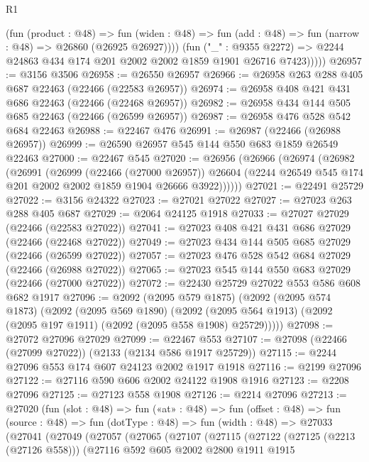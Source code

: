 \begin{lexlean}{R1}
\begin{coremodule}
                (fun (product : @48) =>
                fun (widen : @48) =>
                fun (add : @48) => fun (narrow : @48) => @26860 (@26925 @26927))))
            (fun ("_" : @9355 @2272) =>
            @2244 @24863 @434 @174 @201 @2002 @2002 @1859 @1901 @26716 @7423)))))
@26957 := @3156 @3506
@26958 := @26550 @26957
@26966 := @26958 @263 @288 @405 @687 @22463 (@22466 (@22583 @26957))
@26974 := @26958 @408 @421 @431 @686 @22463 (@22466 (@22468 @26957))
@26982 := @26958 @434 @144 @505 @685 @22463 (@22466 (@26599 @26957))
@26987 := @26958 @476 @528 @542 @684 @22463
@26988 := @22467 @476
@26991 := @26987 (@22466 (@26988 @26957))
@26999 := @26590 @26957 @545 @144 @550 @683 @1859 @26549 @22463
@27000 := @22467 @545
@27020 := @26956
    (@26966
      (@26974
        (@26982
          (@26991
            (@26999
              (@22466 (@27000 @26957))
              @26604
              (@2244 @26549 @545 @174 @201 @2002 @2002 @1859 @1904 @26666 @3922))))))
@27021 := @22491 @25729
@27022 := @3156 @24322
@27023 := @27021 @27022
@27027 := @27023 @263 @288 @405 @687
@27029 := @2064 @24125 @1918
@27033 := @27027 @27029 (@22466 (@22583 @27022))
@27041 := @27023 @408 @421 @431 @686 @27029 (@22466 (@22468 @27022))
@27049 := @27023 @434 @144 @505 @685 @27029 (@22466 (@26599 @27022))
@27057 := @27023 @476 @528 @542 @684 @27029 (@22466 (@26988 @27022))
@27065 := @27023 @545 @144 @550 @683 @27029 (@22466 (@27000 @27022))
@27072 := @22430 @25729 @27022 @553 @586 @608 @682 @1917
@27096 := @2092
    (@2095 @579 @1875)
    (@2092
      (@2095 @574 @1873)
      (@2092
        (@2095 @569 @1890)
        (@2092 (@2095 @564 @1913) (@2092 (@2095 @197 @1911) (@2092 (@2095 @558 @1908) @25729)))))
@27098 := @27072 @27096 @27029
@27099 := @22467 @553
@27107 := @27098 (@22466 (@27099 @27022)) (@2133 (@2134 @586 @1917 @25729))
@27115 := @2244 @27096 @553 @174 @607 @24123 @2002 @1917 @1918
@27116 := @2199 @27096
@27122 := @27116 @590 @606 @2002 @24122 @1908 @1916
@27123 := @2208 @27096
@27125 := @27123 @558 @1908
@27126 := @2214 @27096
@27213 := @27020
    (fun (slot : @48) =>
    fun («at» : @48) =>
    fun (offset : @48) =>
    fun (source : @48) =>
    fun (dotType : @48) =>
    fun (width : @48) =>
    @27033
      (@27041
        (@27049
          (@27057
            (@27065
              (@27107
                (@27115
                  (@27122
                    (@27125 (@2213 (@27126 @558)))
                    (@27116
                      @592
                      @605
                      @2002
                      @2800
                      @1911
                      @1915

\end{coremodule}
\end{lexlean}

